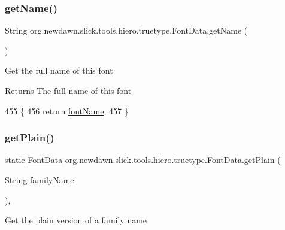 \subsubsection{\texorpdfstring{get\+Name()}{getName()}}
{\footnotesize\ttfamily String org.\+newdawn.\+slick.\+tools.\+hiero.\+truetype.\+Font\+Data.\+get\+Name (\begin{DoxyParamCaption}{ }\end{DoxyParamCaption})\hspace{0.3cm}{\ttfamily [inline]}}

Get the full name of this font

\begin{DoxyReturn}{Returns}
The full name of this font 
\end{DoxyReturn}

\begin{DoxyCode}
455                             \{
456         \textcolor{keywordflow}{return} \mbox{\hyperlink{classorg_1_1newdawn_1_1slick_1_1tools_1_1hiero_1_1truetype_1_1_font_data_a310b630dcf7d0c51861fcf095324bbb4}{fontName}};
457     \}
\end{DoxyCode}
\mbox{\label{classorg_1_1newdawn_1_1slick_1_1tools_1_1hiero_1_1truetype_1_1_font_data_a72f18ab0dc984ba26022b978991284bc}} 
\subsubsection{\texorpdfstring{get\+Plain()}{getPlain()}}
{\footnotesize\ttfamily static \mbox{\hyperlink{classorg_1_1newdawn_1_1slick_1_1tools_1_1hiero_1_1truetype_1_1_font_data}{Font\+Data}} org.\+newdawn.\+slick.\+tools.\+hiero.\+truetype.\+Font\+Data.\+get\+Plain (\begin{DoxyParamCaption}\item[{String}]{family\+Name }\end{DoxyParamCaption})\hspace{0.3cm}{\ttfamily [inline]}, {\ttfamily [static]}}

Get the plain version of a family name


